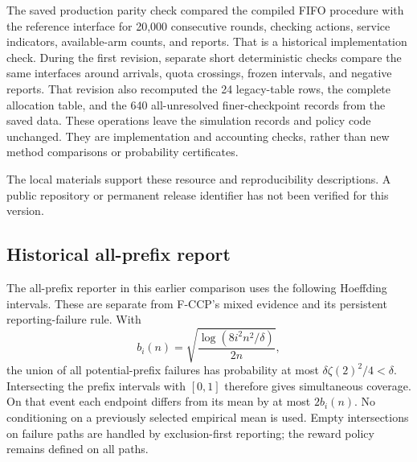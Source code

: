 \documentclass[11pt]{article}
\theoremstyle{remark}
\begin{document}
The saved production parity check compared the compiled FIFO procedure
with the reference interface for 20,000 consecutive rounds, checking
actions, service indicators, available-arm counts, and reports. That is a
historical implementation check. During the first revision, separate short
deterministic checks compare the same interfaces around arrivals, quota
crossings, frozen intervals, and negative reports. That revision also
recomputed the 24 legacy-table rows, the complete allocation table, and the
640 all-unresolved finer-checkpoint records from the saved data.
These operations leave the simulation records and policy code unchanged.
They are implementation and accounting checks, rather than new method
comparisons or probability certificates.

The local materials support these resource and reproducibility
descriptions. A public repository or permanent release identifier has not
been verified for this version.



\subsection{Historical all-prefix report}
\label{app:legacy-prefix}
The all-prefix reporter in this earlier comparison uses the following
Hoeffding intervals. These are separate from F-CCP's mixed evidence and
its persistent reporting-failure rule.
With
\[
 b_i(n)=\sqrt{\frac{\log(8i^2n^2/\delta)}{2n}},
\]
the union of all potential-prefix failures has probability at most
$\delta\zeta(2)^2/4<\delta$. Intersecting the prefix intervals with $[0,1]$
therefore gives simultaneous coverage. On that event each endpoint differs
from its mean by at most $2b_i(n)$. No conditioning on a previously selected
empirical mean is used. Empty intersections on failure paths are handled by
exclusion-first reporting; the reward policy remains defined on all paths.


\FloatBarrier


\end{document}
